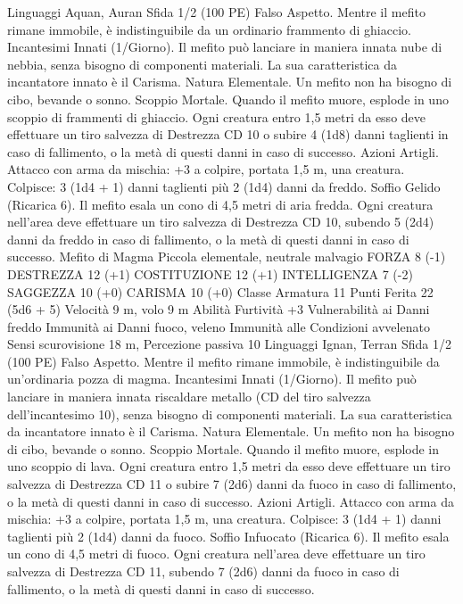 \begin{multicols}{2}
Linguaggi Aquan, Auran
Sfida 1/2 (100 PE)
Falso Aspetto. Mentre il mefito rimane immobile, è
indistinguibile da un ordinario frammento di ghiaccio.
Incantesimi Innati (1/Giorno). Il mefito può lanciare in maniera
innata nube di nebbia, senza bisogno di componenti materiali. La
sua caratteristica da incantatore innato è il Carisma.
Natura Elementale. Un mefito non ha bisogno di cibo, bevande
o sonno.
Scoppio Mortale. Quando il mefito muore, esplode in uno
scoppio di frammenti di ghiaccio. Ogni creatura entro 1,5 metri
da esso deve effettuare un tiro salvezza di Destrezza CD 10 o
subire 4 (1d8) danni taglienti in caso di fallimento, o la metà di
questi danni in caso di successo.
Azioni
Artigli. Attacco con arma da mischia: +3 a colpire, portata 1,5
m, una creatura.
Colpisce: 3 (1d4 + 1) danni taglienti più 2 (1d4) danni da freddo.
Soffio Gelido (Ricarica 6). Il mefito esala un cono di 4,5 metri di
aria fredda. Ogni creatura nell’area deve effettuare un tiro
salvezza di Destrezza CD 10, subendo 5 (2d4) danni da freddo in
caso di fallimento, o la metà di questi danni in caso di successo.
Mefito di Magma
Piccola elementale, neutrale malvagio
FORZA 8 (-1)
DESTREZZA 12 (+1)
COSTITUZIONE 12 (+1)
INTELLIGENZA 7 (-2)
SAGGEZZA 10 (+0)
CARISMA 10 (+0)
Classe Armatura 11
Punti Ferita 22 (5d6 + 5)
Velocità 9 m, volo 9 m
Abilità Furtività +3
Vulnerabilità ai Danni freddo
Immunità ai Danni fuoco, veleno
Immunità alle Condizioni avvelenato
Sensi scurovisione 18 m, Percezione passiva 10
Linguaggi Ignan, Terran
Sfida 1/2 (100 PE)
Falso Aspetto. Mentre il mefito rimane immobile, è
indistinguibile da un’ordinaria pozza di magma.
Incantesimi Innati (1/Giorno). Il mefito può lanciare in maniera
innata riscaldare metallo (CD del tiro salvezza dell’incantesimo
10), senza bisogno di componenti materiali. La sua caratteristica
da incantatore innato è il Carisma.
Natura Elementale. Un mefito non ha bisogno di cibo, bevande
o sonno.
Scoppio Mortale. Quando il mefito muore, esplode in uno
scoppio di lava. Ogni creatura entro 1,5 metri da esso deve
effettuare un tiro salvezza di Destrezza CD 11 o subire 7 (2d6)
danni da fuoco in caso di fallimento, o la metà di questi danni in
caso di successo.
Azioni
Artigli. Attacco con arma da mischia: +3 a colpire, portata 1,5
m, una creatura.
Colpisce: 3 (1d4 + 1) danni taglienti più 2 (1d4) danni da fuoco.
Soffio Infuocato (Ricarica 6). Il mefito esala un cono di 4,5
metri di fuoco. Ogni creatura nell’area deve effettuare un tiro
salvezza di Destrezza CD 11, subendo 7 (2d6) danni da fuoco in
caso di fallimento, o la metà di questi danni in caso di successo.

\end{multicols}
